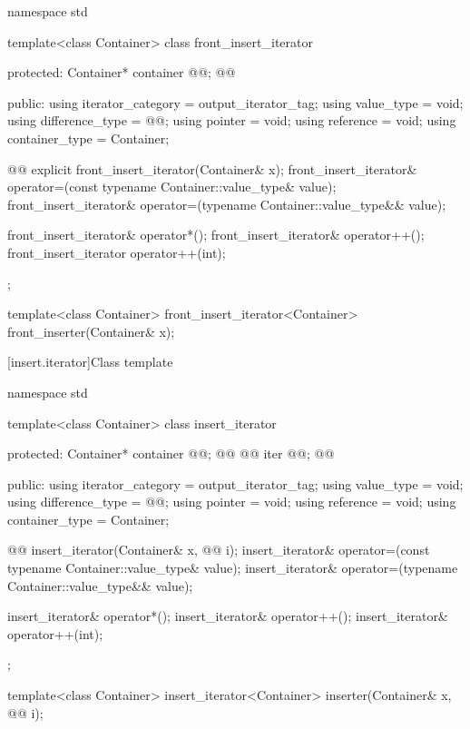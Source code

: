 %
\begin{codeblock}
namespace std {
  template<class Container>
  class front_insert_iterator {
  protected:
    Container* container @@; @\added{// \expos}@

  public:
    using iterator_category = output_iterator_tag;
    using value_type        = void;
    using difference_type   = @@;
    using pointer           = void;
    using reference         = void;
    using container_type    = Container;

    @@
    explicit front_insert_iterator(Container& x);
    front_insert_iterator& operator=(const typename Container::value_type& value);
    front_insert_iterator& operator=(typename Container::value_type&& value);

    front_insert_iterator& operator*();
    front_insert_iterator& operator++();
    front_insert_iterator  operator++(int);
  };

  template<class Container>
    front_insert_iterator<Container> front_inserter(Container& x);
}
\end{codeblock}


[insert.iterator]{Class template }


%
\begin{codeblock}
namespace std {
  template<class Container>
  class insert_iterator {
  protected:
    Container* container @@; @\added{// \expos}@
    @@ iter @\added{\{\}}@; @\added{// \expos}@

  public:
    using iterator_category = output_iterator_tag;
    using value_type        = void;
    using difference_type   = @@;
    using pointer           = void;
    using reference         = void;
    using container_type    = Container;

    @@
    insert_iterator(Container& x, @@ i);
    insert_iterator& operator=(const typename Container::value_type& value);
    insert_iterator& operator=(typename Container::value_type&& value);

    insert_iterator& operator*();
    insert_iterator& operator++();
    insert_iterator& operator++(int);
  };

  template<class Container>
    insert_iterator<Container> inserter(Container& x, @@ i);
}
\end{codeblock}

